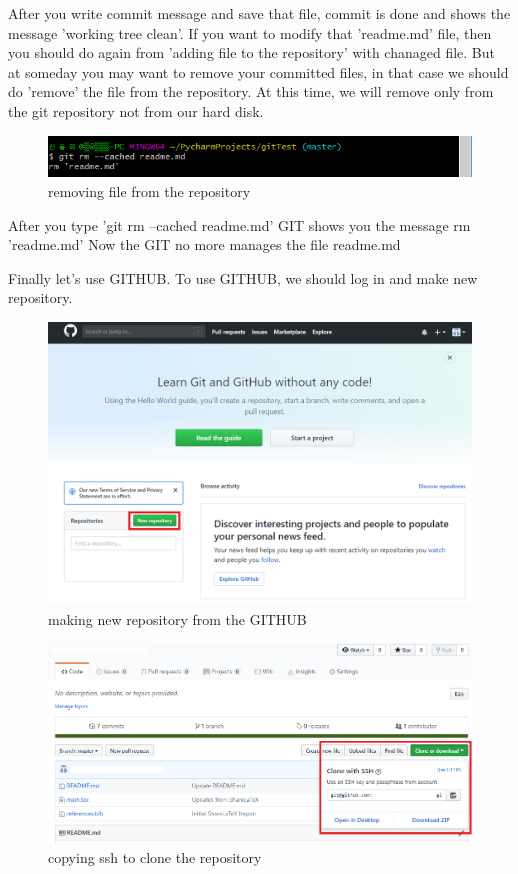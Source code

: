 \documentclass{article}
\begin{document}
After you write commit message and save that file, commit is done and shows the message 'working tree clean'. If you want to modify that 'readme.md' file, then you should do again from 'adding file to the repository' with chanaged file. But at someday you may want to remove your committed files, in that case we should do 'remove' the file from the repository. At this time, we will remove only from the git repository not from our hard disk.
\begin{figure}[h]
\centering
\includegraphics[scale=0.75]{remove.png}
\caption{removing file from the repository}
\label{fig:removing file from the repository}
\end{figure}

After you type 'git rm --cached readme.md' GIT shows you the message rm 'readme.md' Now the GIT no more manages the file readme.md

Finally let's use GITHUB. To use GITHUB, we should log in and make new repository.
\newpage
\begin{figure}[h]
\centering
\includegraphics[scale=0.42]{GITHUB.png}
\caption{making new repository from the GITHUB}
\label{fig:making new repository from the GITHUB}
\end{figure}

\begin{figure}[h]
\centering
\includegraphics[scale=0.42]{ssh.png}
\caption{copying ssh to clone the repository}
\label{fig:copying ssh to clone the repository}
\end{figure}
\end{document}

